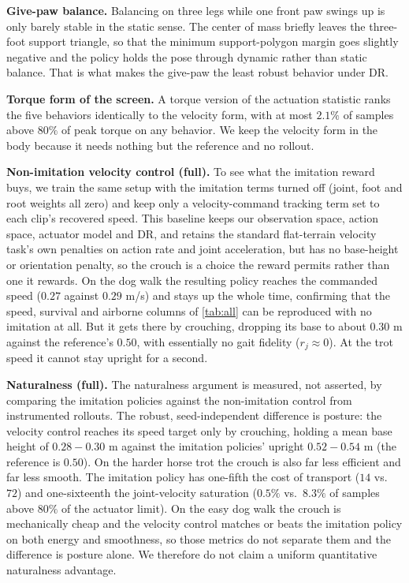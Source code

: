 \textbf{Give-paw balance.} Balancing on three legs while one front paw swings up is only barely stable in the static sense. The center of mass briefly leaves the three-foot support triangle, so that the minimum support-polygon margin goes slightly negative and the policy holds the pose through dynamic rather than static balance. That is what makes the give-paw the least robust behavior under DR.

\textbf{Torque form of the screen.} A torque version of the actuation statistic ranks the five behaviors identically to the velocity form, with at most $2.1\%$ of samples above $80\%$ of peak torque on any behavior. We keep the velocity form in the body because it needs nothing but the reference and no rollout.

\textbf{Non-imitation velocity control (full).} To see what the imitation reward buys, we train the same setup with the imitation terms turned off (joint, foot and root weights all zero) and keep only a velocity-command tracking term set to each clip's recovered speed. This baseline keeps our observation space, action space, actuator model and DR, and retains the standard flat-terrain velocity task's own penalties on action rate and joint acceleration, but has no base-height or orientation penalty, so the crouch is a choice the reward permits rather than one it rewards. On the dog walk the resulting policy reaches the commanded speed ($0.27$ against $0.29$ m/s) and stays up the whole time, confirming that the speed, survival and airborne columns of \autoref{tab:all} can be reproduced with no imitation at all. But it gets there by crouching, dropping its base to about $0.30$ m against the reference's $0.50$, with essentially no gait fidelity ($r_j\approx0$). At the trot speed it cannot stay upright for a second.

\textbf{Naturalness (full).} The naturalness argument is measured, not asserted, by comparing the imitation policies against the non-imitation control from instrumented rollouts. The robust, seed-independent difference is posture: the velocity control reaches its speed target only by crouching, holding a mean base height of $0.28-0.30$ m against the imitation policies' upright $0.52-0.54$ m (the reference is $0.50$). On the harder horse trot the crouch is also far less efficient and far less smooth. The imitation policy has one-fifth the cost of transport ($14$ vs.\ $72$) and one-sixteenth the joint-velocity saturation ($0.5\%$ vs.\ $8.3\%$ of samples above $80\%$ of the actuator limit). On the easy dog walk the crouch is mechanically cheap and the velocity control matches or beats the imitation policy on both energy and smoothness, so those metrics do not separate them and the difference is posture alone. We therefore do not claim a uniform quantitative naturalness advantage.

